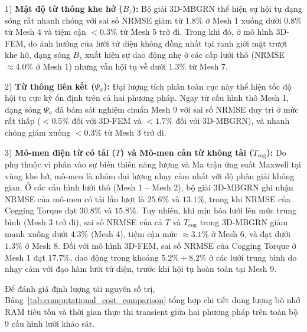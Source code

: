 1) \textbf{Mật độ từ thông khe hở ($B_z$):} Bộ giải 3D-MBGRN thể hiện sự hội tụ dạng sóng rất nhanh chóng với sai số NRMSE giảm từ $1.8\%$ ở Mesh 1 xuống dưới $0.8\%$ từ Mesh 4 và tiệm cận $< 0.3\%$ từ Mesh 5 trở đi. Trong khi đó, ở mô hình 3D-FEM, do ảnh hưởng của lưới tứ diện không đồng nhất tại ranh giới mặt trượt khe hở, dạng sóng $B_z$ xuất hiện sự dao động nhẹ ở các cấp lưới thô (NRMSE $\approx 4.0\%$ ở Mesh 1) nhưng vẫn hội tụ về dưới $1.3\%$ từ Mesh 7.

2) \textbf{Từ thông liên kết ($\Psi_a$):} Đại lượng tích phân toàn cục này thể hiện tốc độ hội tụ cực kỳ ổn định trên cả hai phương pháp. Ngay từ cấu hình thô Mesh 1, dạng sóng $\Psi_a$ đã bám sát nghiệm chuẩn Mesh 9 với sai số NRMSE duy trì ở mức rất thấp ($< 0.5\%$ đối với 3D-FEM và $< 1.7\%$ đối với 3D-MBGRN), và nhanh chóng giảm xuống $< 0.3\%$ từ Mesh 3 trở đi.

3) \textbf{Mô-men điện từ có tải ($T$) và Mô-men cản từ không tải ($T_{\text{cog}}$):} Do phụ thuộc vi phân vào sự biến thiên năng lượng và Ma trận ứng suất Maxwell tại vùng khe hở, mô-men là nhóm đại lượng nhạy cảm nhất với độ phân giải không gian. Ở các cấu hình lưới thô (Mesh 1 -- Mesh 2), bộ giải 3D-MBGRN ghi nhận NRMSE của mô-men có tải lần lượt là $25.6\%$ và $13.1\%$, trong khi NRMSE của Cogging Torque đạt $30.8\%$ và $15.8\%$. Tuy nhiên, khi mịn hóa lưới lên mức trung bình (Mesh 3 trở đi), sai số NRMSE của cả $T$ và $T_{\text{cog}}$ trong 3D-MBGRN giảm mạnh xuống dưới $4.3\%$ (Mesh 4), tiệm cận mức $\approx 3.1\%$ ở Mesh 6, và đạt dưới $1.3\%$ ở Mesh 8. Đối với mô hình 3D-FEM, sai số NRMSE của Cogging Torque ở Mesh 1 đạt $17.7\%$, dao động trong khoảng $5.2\% \div 8.2\%$ ở các lưới trung bình do nhạy cảm với đạo hàm lưới tứ diện, trước khi hội tụ hoàn toàn tại Mesh 9.

Để đánh giá định lượng tài nguyên số trị, Bảng~\ref{tab:computational_cost_comparison} tổng hợp chi tiết dung lượng bộ nhớ RAM tiêu tốn và thời gian thực thi transient giữa hai phương pháp trên toàn bộ 9 cấu hình lưới khảo sát.

